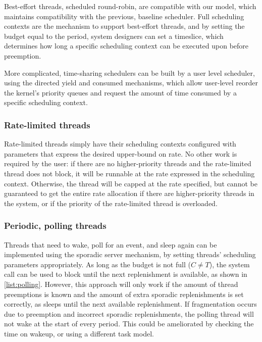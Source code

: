 Best-effort threads, scheduled round-robin, are compatible with our model, which maintains
compatibility with the previous, baseline \selfour scheduler.  Full scheduling contexts are the
mechanism to support best-effort threads, and by setting the budget equal to the period, system
designers can set a timeslice, which determines how long a specific scheduling context can be
executed upon before preemption.

More complicated, time-sharing schedulers can be built by a user level scheduler, using the directed
yield and consumed mechanisms, which allow user-level reorder the kernel's priority queues and
request the amount of time consumed by a specific scheduling context.

\subsubsection{Rate-limited threads}

Rate-limited threads simply have their scheduling contexts configured with
parameters that express the desired upper-bound on rate.  No other work is
required by the user: if there are no higher-priority threads and the
rate-limited thread does not block, it will be runnable at the rate expressed
in the scheduling context.  Otherwise, the thread will be capped at the rate
specified, but cannot be guaranteed to get the entire rate allocation if there
are higher-priority threads in the system, or if the priority of the
rate-limited thread is overloaded.

\subsubsection{Periodic, polling threads}

Threads that need to wake, poll for an event, and sleep again can be
implemented using the sporadic server mechanism, by  
setting threads' scheduling parameters appropriately. As long as the budget is
not full ($C\neq T$), the \yield system call can be used to block until the next replenishment
is available, as shown in \cref{list:polling}. However, this approach will only work if the amount of thread preemptions 
is known and the amount of extra sporadic replenishments is set correctly, as \yield sleeps until
the next available replenishment. If fragmentation occurs due to preemption and incorrect sporadic
replenishments, the polling thread will not wake at the start of every period. This could be
ameliorated by checking the time on wakeup, or using a different task model.  


